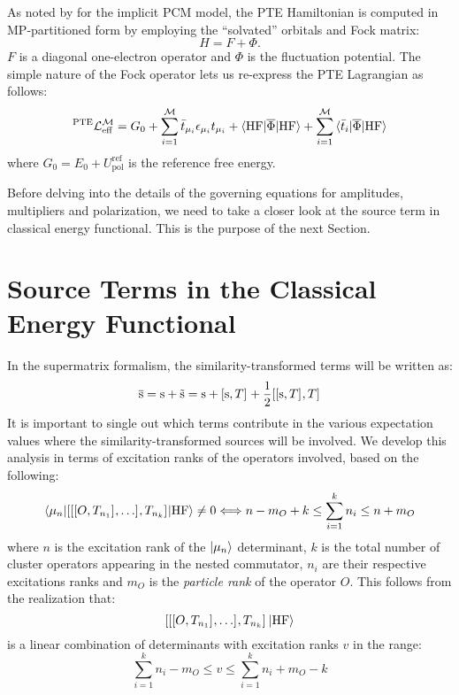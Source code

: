 As noted by \citeauthor{Cammi2009-gu} for the implicit \acrshort{PCM} model,
the \acrshort{PTE} Hamiltonian is computed in \acrshort{MP}-partitioned form by
employing the ``solvated'' orbitals and Fock matrix:
\begin{equation}
  H = F + \Phi.
\end{equation}
$F$ is a diagonal one-electron operator and $\Phi$ is the
fluctuation potential.
The simple nature of the Fock operator lets us re-express the \acrshort{PTE}
Lagrangian as follows:
\begin{equation}
{}^\mathrm{PTE}\mathcal{L}^\mathcal{M}_\mathrm{eff}
  =
  G_0
  + \sum_{i=1}^{\mathcal{M}}\bar{t}_{\mu_i}\epsilon_{\mu_i}t_{\mu_i}
  + \braket{\mathrm{HF} | \overline{\Phi} | \mathrm{HF}}
  + \sum_{i=1}^{\mathcal{M}}\braket{\bar{t}_{i} | \overline{\Phi} | \mathrm{HF}}
\end{equation}
where $G_0 = E_0 + U_\mathrm{pol}^\mathrm{ref}$ is the reference free
energy.

Before delving into the details of the governing equations for
amplitudes, multipliers and polarization, we need to take a closer look
at the source term in classical energy functional. This is the purpose
of the next Section.

\section{Source Terms in the Classical Energy Functional}
\label{sec:source-terms}

In the supermatrix formalism, the similarity-transformed terms will be
written as:
\begin{equation}
  \overline{\mathrm{s}} = \mathrm{s} + \tilde{\mathrm{s}} = \mathrm{s} +
  [ \mathrm{s}, T ]^{} +
  \frac{1}{2}[ [ \mathrm{s}, T ]^{}, T ]^{}
\end{equation}
It is important to single out which terms contribute in the various
expectation values where the similarity-transformed sources will be
involved.
We develop this analysis in terms of excitation ranks of the operators
involved, based on the following:
\begin{equation}
  \braket{\mu_n |
  [ [ [ O, T_{n_1} ]^{}, \ldots ]^{}, T_{n_k} ]^{} | \mathrm{HF}} \neq 0
  \Longleftrightarrow
  n - m_O + k \leq \sum_{i=1}^k n_i \leq n + m_O
\end{equation}
where $n$ is the excitation rank of the $\ket{\mu_n}$ determinant, $k$
is the total number of cluster operators appearing in the nested
commutator, $n_i$ are their respective excitations ranks and $m_O$
is the \emph{particle rank} of the operator $O$.\autocite{Helgaker2000-tz}
This follows from the realization that:
\begin{equation}
  [ [ [ O, T_{n_1} ]^{}, \ldots ]^{}, T_{n_k} ]^{} \ket{\mathrm{HF}}
\end{equation}
is a linear combination of determinants with excitation ranks $v$ in the
range:
\begin{equation}
  \sum_{i=1}^k n_i - m_O \leq v \leq \sum_{i=1}^k n_i + m_O -k
\end{equation}

